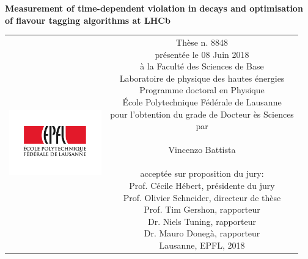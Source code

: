 \begin{titlepage}
\begin{center}
\sffamily


\null\vspace{2cm}
{\huge \textbf{Measurement of time-dependent}  \textbf{violation in}  \textbf{decays and optimisation of flavour tagging algorithms at LHCb} } \\
    
\vfill

\begin{tabular} {cc}
\parbox{0.3\textwidth}{\includegraphics[width=4cm]{images/epfl}}
&
\parbox{0.7\textwidth}{%
	Th\`ese n. 8848\\
	pr\'esent\'ee le 08 Juin 2018\\
         \`a la Facult\'e des Sciences de Base\\
	Laboratoire de physique des hautes \'energies \\
	Programme doctoral en Physique\\
        \'Ecole Polytechnique F\'ed\'erale de Lausanne\\
	
	pour l'obtention du grade de Docteur \`es Sciences\\
	par\\ 
	\\
	\null \hspace{3em} Vincenzo Battista\\
%
\\

\small
accept\'ee sur proposition du jury:\\
%
    Prof.  C\'ecile H\'ebert, pr\'esidente du jury\\
    Prof.  Olivier Schneider, directeur de th\`ese\\
    Prof.  Tim Gershon, rapporteur\\
    Dr.    Niels Tuning, rapporteur\\
    Dr.    Mauro Doneg\`a, rapporteur\\
%


Lausanne, EPFL, 2018}
\end{tabular}
\end{center}
\vspace{2cm}
\end{titlepage}



